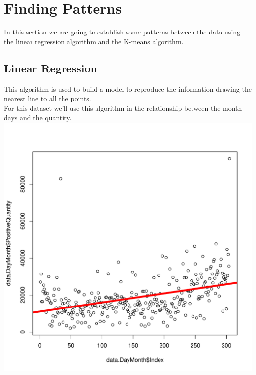 \documentclass[conference]{IEEEtran}\usepackage[]{graphicx}\usepackage[]{color}
\makeatletter
\def\maxwidth{ %
  \ifdim\Gin@nat@width>\linewidth
    \linewidth
  \else
    \Gin@nat@width
  \fi
}
\newenvironment{knitrout}{}{} %
\makeatother
\begin{document}
\section{Finding Patterns}
In this section we are going to establish some patterns between the data using the linear regression algorithm and the K-means algorithm.\\
\subsection{Linear Regression}
This algorithm is used to build a model to reproduce the information drawing the nearest line to all the points.\\
For this dataset we'll use this algorithm in the relationship between the month days and the quantity.
\begin{knitrout}
\color{fgcolor}
\includegraphics[width=\maxwidth]{figure/linear-regression-1} 

\end{knitrout}
\end{document}
